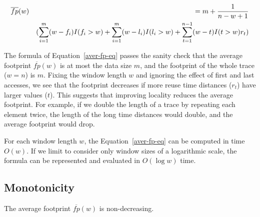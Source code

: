 \begin{eqnarray}
\small
\label{aver-fp-eq}
&\overline{fp}(w)&=m+\frac{1}{n-w+1}\\
&\ &( \sum_{i=1}^{m}(w-f_i)I(f_i>w)+\sum_{i=1}^{m}(w-l_i)I(l_i>w)\nonumber+\sum_{t=1}^{n-1}(w-t)I(t>w) r_t )\nonumber
\end{eqnarray}

The formula of Equation~\ref{aver-fp-eq} passes the sanity check that the
average footprint $\overline{fp}(w)$ is at most the data size $m$, and
the footprint of the whole trace ($w=n$) is $m$.  Fixing the window
length $w$ and ignoring the effect of first and last accesses, we see
that the footprint decreases if more reuse time distances
($r_t$) have larger values ($t$).  This suggests that improving
locality reduces the average footprint.  For example, if we double the
length of a trace by repeating each element twice, the length of the
long time distances would double, and the average footprint would
drop.

For each window length $w$, the Equation~\ref{aver-fp-eq} can be computed in
time $O(w)$.  If we limit to consider only window sizes of a
logarithmic scale, the formula can be represented and evaluated in
$O(\log w)$ time.

\subsection{Monotonicity}
\label{subsec:aver-fp-mono}
\newcommand{\qedblob}{\mbox{\rule[-1.5pt]{5pt}{10.5pt}}}
\def\qed{{\ \nolinebreak\hfill\mbox{\qedblob\quad}}}

\begin{theorem} The average footprint $\overline{fp}(w)$ is non-decreasing.
\label{th1}
\end{theorem}

